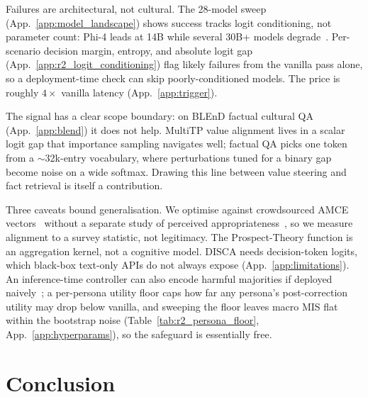 \documentclass{article}
\begin{document}
Failures are architectural, not cultural. The 28-model sweep (App.~\ref{app:model_landscape}) shows success tracks logit conditioning, not parameter count: Phi-4 leads at 14B while several 30B+ models degrade~\citep{chand2026nofree}. Per-scenario decision margin, entropy, and absolute logit gap (App.~\ref{app:r2_logit_conditioning}) flag likely failures from the vanilla pass alone, so a deployment-time check can skip poorly-conditioned models. The price is roughly $4\times$ vanilla latency (App.~\ref{app:trigger}).

The signal has a clear scope boundary: on BLEnD factual cultural QA~\citep{myung2024blend} (App.~\ref{app:blend}) it does not help. MultiTP value alignment lives in a scalar logit gap that importance sampling navigates well; factual QA picks one token from a $\sim$32k-entry vocabulary, where perturbations tuned for a binary gap become noise on a wide softmax. Drawing this line between value steering and fact retrieval is itself a contribution.

Three caveats bound generalisation. We optimise against crowdsourced AMCE vectors~\citep{awad2018moral, jin2025multitp} without a separate study of perceived appropriateness~\citep{atari2023humans, khan2025randomness}, so we measure alignment to a survey statistic, not legitimacy. The Prospect-Theory function is an aggregation kernel, not a cognitive model. DISCA needs decision-token logits, which black-box text-only APIs do not always expose (App.~\ref{app:limitations}). An inference-time controller can also encode harmful majorities if deployed naively~\citep{zewail2025moral}; a per-persona utility floor caps how far any persona's post-correction utility may drop below vanilla, and sweeping the floor leaves macro MIS flat within the bootstrap noise (Table~\ref{tab:r2_persona_floor}, App.~\ref{app:hyperparams}), so the safeguard is essentially free.
\vspace{-0.4cm}
\section{Conclusion}
\label{sec:conclusion}
\vspace{-0.2cm}
\end{document}
